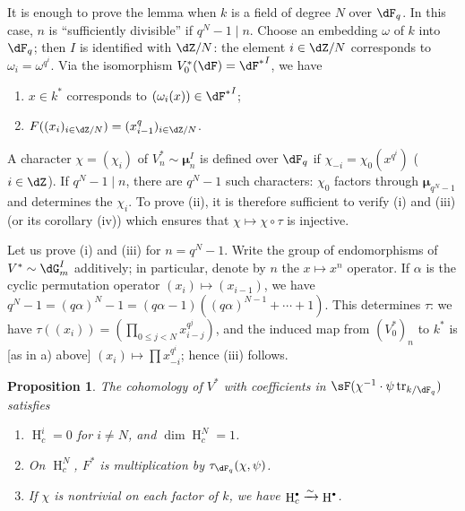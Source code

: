 \documentclass[oneside]{book}
\DeclareMathOperator{\h}{H}
\DeclareMathOperator{\tr}{tr}
\newcommand{\dmu}{{\bm\mu}}
\newcounter{char}
\newcommand{\iso}{\xrightarrow\sim}
\theoremstyle{sga-source}
\theoremstyle{sga-source-dash}
\theoremstyle{sga-source-dotdash}
\theoremstyle{sga-source-number-note-dash}
\theoremstyle{sga-source-note-number-dotdash}
\theoremstyle{sga-source-example-dotdash}
\theoremstyle{sga-source-inline-number}
\theoremstyle{sga-source-bare-number}
\theoremstyle{sga-source}
\newtheorem{proposition_}[subsection]{Proposition}
\let\oldbullet\bullet
\renewcommand{\bullet}{\textnormal{\tiny$\oldbullet$}}
\newcommand{\PrintPage}[1]{}\newcommand{\MathPage}[1]{}\newcommand{\PrintCite}[2]{#1}\newcommand{\var}[3]{#1}
\begin{document}
It is enough to prove the lemma when $k$ is a field of degree $N$ over 
$\dF_q$. In this case, $n$ is ``sufficiently divisible'' if $q^N-1\mid n$. 
Choose \var{an embedding $\omega$ of $k$ into $\dF_q$}{an embedding $\omega$ of $k$ into $\dF$}{S45-SOL-0820}; then $I$ is identified 
with $\dZ/N$: the element $i\in \dZ/N$ corresponds to $\omega_i=\omega^{q^i}$. Via 
the isomorphism $V_0^\ast(\dF) = {\dF^\ast}^I$, we have 
\begin{enumerate}[\indent a)]
  \item $x\in k^\ast$ corresponds to $(\omega_i(x))\in {\dF^\ast}^I$; 
  \item $F((x_i)_{i\in \dZ/N})=(x_{i-1}^q)_{i\in \dZ/N}$. 
\end{enumerate}

\PrintPage{201}
A character $\chi=(\chi_i)$ of $V_n^\ast\sim \dmu_n^I$ is defined over 
$\dF_q$ if $\chi_{-i} =\chi_0(x^{q^i})$ ($i\in \dZ$). If $q^N-1\mid n$, there are 
$q^N-1$ such characters: $\chi_0$ factors through $\dmu_{q^N-1}$ and 
determines the $\chi_i$. To prove (ii), it is therefore sufficient to verify (i) 
and (iii) (or its corollary (iv)) which ensures that $\chi\mapsto \chi\circ \tau$ 
is injective. 

Let us prove (i) and (iii) for $n=q^N-1$. Write the group of 
endomorphisms of $V^\ast\sim \dG_m^I$ additively; in particular, denote by $n$ 
the $x\mapsto x^n$ operator. If $\alpha$ is the cyclic permutation operator 
$(x_i)\mapsto (x_{i-1})$, we have 
$q^N-1=(q\alpha)^N-1 = (q\alpha-1)((q\alpha)^{N-1}+\cdots + 1)$. This 
determines $\tau$: we have $\tau((x_i)) = (\prod_{0\leqslant j<N} x_{i-j}^{q^j})$, 
and the induced map from $(V_0^\ast)_n$ to $k^\ast$ is [as in a) above] 
$(x_i)\mapsto \prod x_{-i}^{q^i}$; hence (iii) follows. 





\begin{proposition_}\label{VI:4-10}
The cohomology of $V^\ast$ with coefficients in 
$\sF(\chi^{-1}\cdot \psi\tr_{k/\dF_q})$ satisfies 
\begin{enumerate}[\indent (i)]
  \item $\h_c^i = 0$ for $i\ne N$, and $\dim \h_c^N=1$. 
  \item On $\h_c^N$, $F^\ast$ is multiplication by 
    $\tau_{\dF_q}(\chi,\psi)$. 
  \item If $\chi$ is nontrivial on each factor of $k$, we have 
    $\h_c^\bullet \iso \h^\bullet$. 
\end{enumerate}
\end{proposition_}
\end{document}
